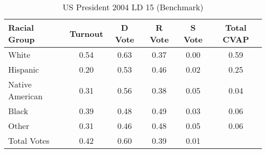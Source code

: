 \begin{table}[htb]
\begin{center}
\caption{US President 2004 LD 15 (Benchmark)}
\label{pres04_cvap_ld_15_benchmark}
\begin{tabular}{lccccc}
  \hline
Racial Group & Turnout & D Vote & R Vote & S Vote & Total CVAP \\ 
  \hline
White & 0.54 & 0.63 & 0.37 & 0.00 & 0.59 \\ 
  Hispanic & 0.20 & 0.53 & 0.46 & 0.02 & 0.25 \\ 
  Native American & 0.31 & 0.56 & 0.38 & 0.05 & 0.04 \\ 
  Black & 0.39 & 0.48 & 0.49 & 0.03 & 0.06 \\ 
  Other & 0.31 & 0.46 & 0.48 & 0.05 & 0.06 \\ 
  Total Votes & 0.42 & 0.60 & 0.39 & 0.01 &  \\ 
   \hline
\end{tabular}
\end{center}
\end{table}
